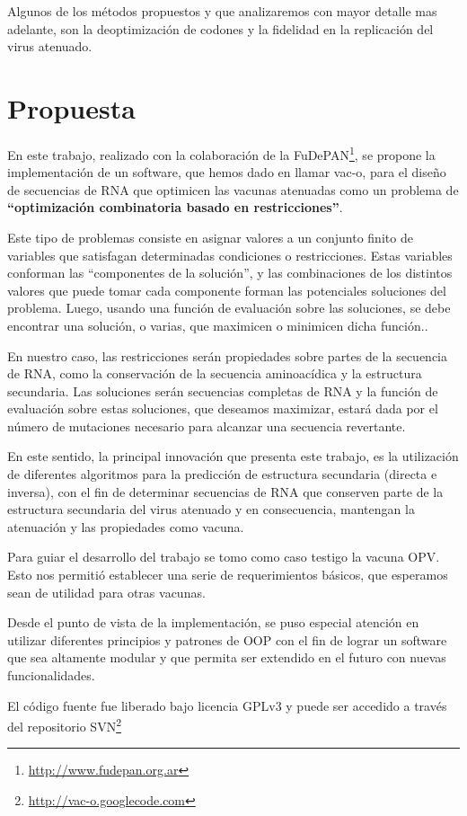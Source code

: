 Algunos de los m\'etodos propuestos y que analizaremos con mayor detalle mas
adelante, son la deoptimizaci\'on  de codones\cite{Coleman08} y la fidelidad en
la replicaci\'on del virus atenuado\cite{Vignuzzi08}.

\section{Propuesta}
\label{propuesta}
En este trabajo, realizado con la colaboraci\'on de la
\ac{FuDePAN}\footnote{\url{http://www.fudepan.org.ar}}, se propone la
implementaci\'on de un software, que hemos dado en llamar \ac{vac-o}, para el
dise\~no de secuencias de \ac{RNA} que optimicen las vacunas atenuadas como un
problema de \textbf{``optimizaci\'on combinatoria basado en restricciones''}. 

Este tipo de problemas consiste en asignar valores a un conjunto finito de
variables que satisfagan determinadas condiciones o restricciones. Estas
variables conforman las ``componentes de la soluci\'on'', y las combinaciones de
los distintos valores que puede tomar cada componente forman las potenciales
soluciones del problema. Luego, usando una funci\'on de evaluaci\'on sobre las
soluciones, se debe encontrar una soluci\'on, o varias, que maximicen o
minimicen dicha funci\'on.\cite{Hoos04}.

En nuestro caso, las restricciones ser\'an propiedades sobre partes de la
secuencia de \ac{RNA}, como la conservaci\'on de la secuencia aminoac\'idica y
la estructura secundaria. Las soluciones ser\'an secuencias completas de
\ac{RNA} y la funci\'on de evaluaci\'on sobre estas soluciones, que deseamos
maximizar, estar\'a dada por el n\'umero de mutaciones necesario para alcanzar
una secuencia revertante.

En este sentido, la principal innovaci\'on que presenta este trabajo, es la
utilizaci\'on de diferentes algoritmos para la predicci\'on de estructura
secundaria (directa e inversa), con el fin de determinar secuencias de
\ac{RNA} que conserven parte de la estructura secundaria del virus atenuado y
en consecuencia, mantengan la atenuaci\'on y las propiedades como vacuna.

Para guiar el desarrollo del trabajo se tomo como caso testigo la vacuna
\ac{OPV}. Esto nos permiti\'o establecer una serie de requerimientos b\'asicos,
que esperamos sean de utilidad para otras vacunas.

Desde el punto de vista de la implementaci\'on, se puso especial atenci\'on en
utilizar diferentes principios y patrones de \ac{OOP} con
el fin de lograr un software que sea altamente modular y que permita ser
extendido en el futuro con nuevas funcionalidades.

El c\'odigo fuente fue liberado bajo licencia \ac{GPLv3} y puede ser accedido a
trav\'es del repositorio \ac{SVN}\footnote{\url{http://vac-o.googlecode.com}}